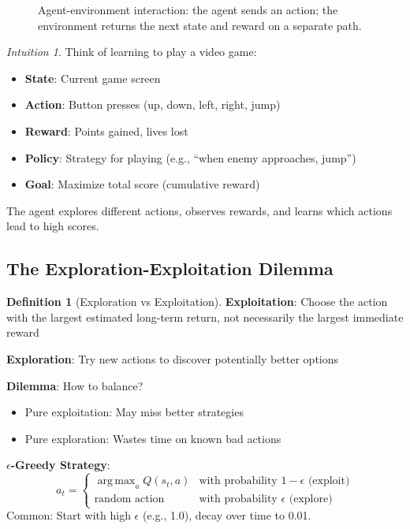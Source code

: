 \documentclass[11pt,twoside]{article}
\numberwithin{equation}{section}
\DeclareMathOperator*{\argmax}{arg\,max}
\theoremstyle{plain}
\theoremstyle{definition}
\newtheorem{definition}[theorem]{Definition}
\theoremstyle{remark}
\newtheorem{intuition}[theorem]{Intuition}
\begin{document}
\begin{figure}[H]
\centering
{}
\caption{Agent-environment interaction: the agent sends an action; the environment returns the next state and reward on a separate path.}
\end{figure}

\begin{intuition}
Think of learning to play a video game:
\begin{itemize}
\item \textbf{State}: Current game screen
\item \textbf{Action}: Button presses (up, down, left, right, jump)
\item \textbf{Reward}: Points gained, lives lost
\item \textbf{Policy}: Strategy for playing (e.g., ``when enemy approaches, jump'')
\item \textbf{Goal}: Maximize total score (cumulative reward)
\end{itemize}

The agent explores different actions, observes rewards, and learns which actions lead to high scores.
\end{intuition}

\subsection{The Exploration-Exploitation Dilemma}

\begin{definition}[Exploration vs Exploitation]
\textbf{Exploitation}: Choose the action with the largest estimated long-term return, not necessarily the largest immediate reward

\textbf{Exploration}: Try new actions to discover potentially better options

\textbf{Dilemma}: How to balance?
\begin{itemize}
\item Pure exploitation: May miss better strategies
\item Pure exploration: Wastes time on known bad actions
\end{itemize}

\textbf{$\epsilon$-Greedy Strategy}:
\[
a_t = \begin{cases}
\argmax_a Q(s_t, a) & \text{with probability } 1-\epsilon \text{ (exploit)} \\
\text{random action} & \text{with probability } \epsilon \text{ (explore)}
\end{cases}
\]
Common: Start with high $\epsilon$ (e.g., 1.0), decay over time to 0.01.
\end{definition}
\end{document}
